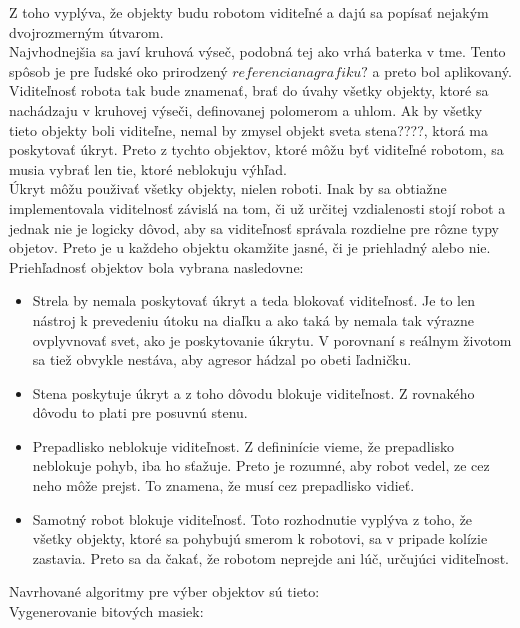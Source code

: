 Z toho vyplýva, že objekty budu robotom viditeľné a dajú  sa  popísať nejakým dvojrozmerným útvarom.\\
 Najvhodnejšia sa javí kruhová výseč, podobná tej ako vrhá baterka v tme. Tento spôsob je pre ľudské oko prirodzený $referencia na grafiku?$ a preto bol aplikovaný.\\
Viditeľnosť robota tak bude znamenať,  brať do úvahy všetky objekty, ktoré sa nachádzaju v kruhovej výseči, definovanej polomerom a uhlom. Ak by všetky tieto objekty boli viditeľne, nemal by zmysel objekt sveta stena????, ktorá ma poskytovať úkryt. Preto z tychto objektov, ktoré môžu byť viditeľné robotom, sa musia vybrať len tie, ktoré neblokuju výhľad. \\
Úkryt môžu použivať všetky objekty, nielen roboti. Inak by sa obtiažne implementovala viditelnosť závislá na tom, či už určitej vzdialenosti stojí robot a jednak nie je logicky dôvod, aby sa viditeľnosť správala rozdielne pre rôzne typy objetov. Preto je u každeho objektu okamžite jasné, či je priehladný alebo nie.\\
Priehľadnosť objektov bola vybrana nasledovne:
\begin{itemize}
\item Strela by nemala poskytovať úkryt a teda blokovať viditeľnosť. Je to len nástroj k prevedeniu útoku na diaľku a ako taká by nemala tak výrazne ovplyvnovať svet, ako je poskytovanie úkrytu. V porovnaní s reálnym životom sa tiež obvykle nestáva, aby agresor hádzal po obeti ľadničku.
\item Stena poskytuje úkryt a z toho dôvodu blokuje viditeľnost. Z rovnakého dôvodu to plati pre posuvnú stenu.
\item Prepadlisko neblokuje viditeľnost. Z defininície vieme, že prepadlisko neblokuje pohyb, iba ho sťažuje. Preto je rozumné, aby robot vedel, ze cez neho môže prejst. To znamena, že musí cez prepadlisko vidieť.
\item Samotný robot blokuje viditeľnosť. Toto rozhodnutie vyplýva z toho, že všetky objekty, ktoré sa pohybujú smerom k robotovi, sa v pripade kolízie zastavia. Preto sa da čakať, že robotom neprejde ani lúč,  určujúci viditeľnost.%
\end{itemize}
Navrhované algoritmy pre výber objektov sú tieto:\\
Vygenerovanie bitových masiek: \\
